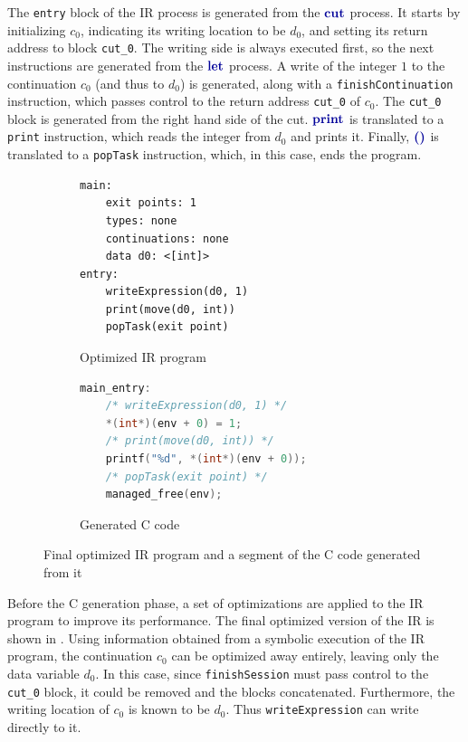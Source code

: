 The \texttt{entry} block of the \ac{IR} process is generated from the $\cutp$ process. It starts by initializing $c_0$, indicating its writing location to be $d_0$, and setting its return address to block \texttt{cut\_0}. The writing side is always executed first, so the next instructions are generated from the $\letp$ process. A write of the integer $1$ to the continuation $c_0$ (and thus to $d_0$) is generated, along with a \texttt{finishContinuation} instruction, which passes control to the return address \texttt{cut\_0} of $c_0$. The \texttt{cut\_0} block is generated from the right hand side of the cut. $\printp$ is translated to a \texttt{print} instruction, which reads the integer from $d_0$ and prints it. Finally, $\emptyp$ is translated to a \texttt{popTask} instruction, which, in this case, ends the program.

\begin{figure}
    \begin{subfigure}{0.45\textwidth}
        \begin{lstlisting}[language=IR]
main:
    exit points: 1
    types: none
    continuations: none
    data d0: <[int]>
entry:
    writeExpression(d0, 1)
    print(move(d0, int))
    popTask(exit point)
        \end{lstlisting}
        \caption{Optimized IR program}
        \label{fig:IROptimizedIntroExample}
    \end{subfigure}
    \hfill
    \begin{subfigure}{0.45\textwidth}
        \begin{lstlisting}[language=C]
main_entry:
    /* writeExpression(d0, 1) */
    *(int*)(env + 0) = 1;
    /* print(move(d0, int)) */
    printf("%d", *(int*)(env + 0));
    /* popTask(exit point) */
    managed_free(env);
        \end{lstlisting}
        \caption{Generated C code}
        \label{fig:CIntroExample}
    \end{subfigure}
    \caption{Final optimized IR program and a segment of the C code generated from it}
\end{figure}

Before the C generation phase, a set of optimizations are applied to the \ac{IR} program to improve its performance. The final optimized version of the \ac{IR} is shown in . Using information obtained from a symbolic execution of the \ac{IR} program, the continuation $c_0$ can be optimized away entirely, leaving only the data variable $d_0$. In this case, since \texttt{finishSession} must pass control to the \texttt{cut\_0} block, it could be removed and the blocks concatenated. Furthermore, the writing location of $c_0$ is known to be $d_0$. Thus \texttt{writeExpression} can write directly to it.

